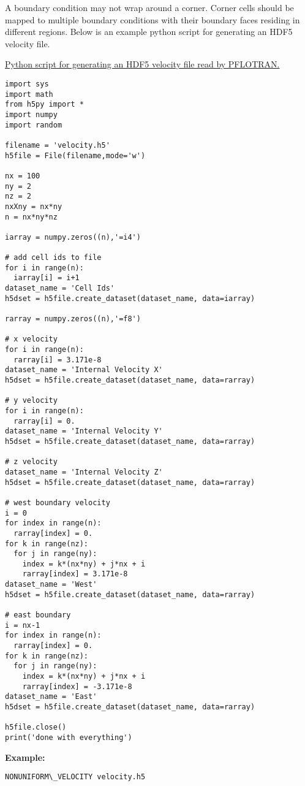 A boundary condition may not wrap around a corner. Corner cells should be mapped to multiple boundary conditions with their boundary faces residing in different regions.  
Below is an example python script for generating an HDF5 velocity file.

\begin{mdframed}
\underline{Python script for generating an HDF5 velocity file read by PFLOTRAN.}
\footnotesize
\begin{Verbatim}
import sys
import math
from h5py import *
import numpy
import random

filename = 'velocity.h5'
h5file = File(filename,mode='w')

nx = 100
ny = 2
nz = 2
nxXny = nx*ny
n = nx*ny*nz

iarray = numpy.zeros((n),'=i4')

# add cell ids to file
for i in range(n):
  iarray[i] = i+1
dataset_name = 'Cell Ids'
h5dset = h5file.create_dataset(dataset_name, data=iarray)

rarray = numpy.zeros((n),'=f8')

# x velocity
for i in range(n):
  rarray[i] = 3.171e-8
dataset_name = 'Internal Velocity X'
h5dset = h5file.create_dataset(dataset_name, data=rarray)

# y velocity
for i in range(n):
  rarray[i] = 0.
dataset_name = 'Internal Velocity Y'
h5dset = h5file.create_dataset(dataset_name, data=rarray)

# z velocity
dataset_name = 'Internal Velocity Z'
h5dset = h5file.create_dataset(dataset_name, data=rarray)

# west boundary velocity
i = 0
for index in range(n):
  rarray[index] = 0.
for k in range(nz):
  for j in range(ny):
    index = k*(nx*ny) + j*nx + i
    rarray[index] = 3.171e-8
dataset_name = 'West'
h5dset = h5file.create_dataset(dataset_name, data=rarray)

# east boundary
i = nx-1
for index in range(n):
  rarray[index] = 0.
for k in range(nz):
  for j in range(ny):
    index = k*(nx*ny) + j*nx + i
    rarray[index] = -3.171e-8
dataset_name = 'East'
h5dset = h5file.create_dataset(dataset_name, data=rarray)

h5file.close()
print('done with everything')
\end{Verbatim}
\end{mdframed}

\begin{mdframed}
{\bf Example: }

\begin{Verbatim}
NONUNIFORM\_VELOCITY velocity.h5
\end{Verbatim}
\end{mdframed}

